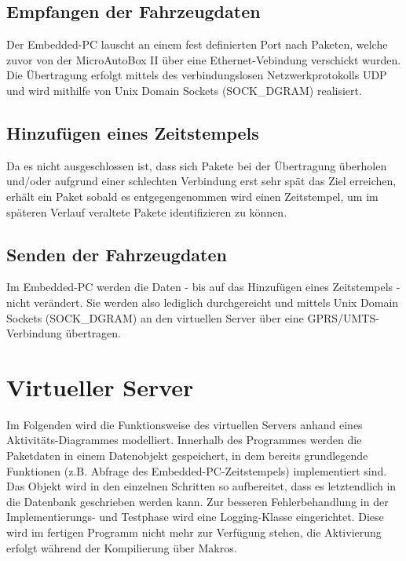 \documentclass[fontsize = 12pt, paper = a4]{scrreprt}
\begin{document}
\subsection{Empfangen der Fahrzeugdaten}

Der Embedded-PC lauscht an einem fest definierten Port nach Paketen, welche zuvor von der MicroAutoBox II über eine Ethernet-Vebindung verschickt wurden. Die Übertragung erfolgt mittels des verbindungslosen Netzwerkprotokolls UDP und wird mithilfe von Unix Domain Sockets (SOCK\_DGRAM) realisiert. 

\subsection{Hinzufügen eines Zeitstempels}

Da es nicht ausgeschlossen ist, dass sich Pakete bei der Übertragung überholen und/oder aufgrund einer schlechten Verbindung erst sehr spät das Ziel erreichen, erhält ein Paket sobald es entgegengenommen wird einen Zeitstempel, um im späteren Verlauf veraltete Pakete identifizieren zu können. 

\subsection{Senden der Fahrzeugdaten}

Im Embedded-PC werden die Daten - bis auf das Hinzufügen eines Zeitstempels - nicht verändert. Sie werden also lediglich durchgereicht und mittels Unix Domain Sockets (SOCK\_DGRAM) an den virtuellen Server über eine GPRS/UMTS-Verbindung übertragen. 

\section{Virtueller Server}

Im Folgenden wird die Funktionsweise des virtuellen Servers anhand eines Aktivitäts-Diagrammes modelliert. Innerhalb des Programmes werden die Paketdaten in einem Datenobjekt gespeichert, in dem bereits grundlegende Funktionen (z.B. Abfrage des Embedded-PC-Zeitstempels) implementiert sind. Das Objekt wird in den einzelnen Schritten so aufbereitet, dass es letztendlich in die Datenbank geschrieben werden kann. Zur besseren Fehlerbehandlung in der Implementierungs- und Testphase wird eine Logging-Klasse eingerichtet. Diese wird im fertigen Programm nicht mehr zur Verfügung stehen, die Aktivierung erfolgt während der Kompilierung über Makros. \\
\end{document}
